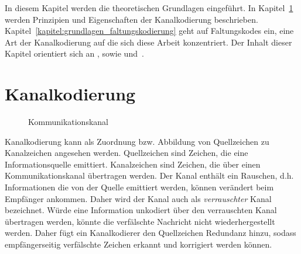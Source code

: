 In diesem Kapitel werden die theoretischen Grundlagen eingeführt. In Kapitel~\ref{kapitel:grundlagen_kanalkodierung} werden Prinzipien und Eigenschaften der Kanalkodierung beschrieben. Kapitel~\ref{kapitel:grundlagen_faltungskodierung} geht auf Faltungskodes ein, eine Art der Kanalkodierung auf die sich diese Arbeit konzentriert. Der Inhalt dieser Kapitel orientiert sich an \cite{huffman2010fundamentals}, sowie \cite{morelos2006art} und~\cite{schonfeld2012informations}.
\section{Kanalkodierung}
\label{kapitel:grundlagen_kanalkodierung}
\begin{figure}[t]
\centering
\resizebox{\textwidth}{!}{%
	
}
\caption{Kommunikationskanal}
\label{abb:kommunikationskanal}
\end{figure}
Kanalkodierung kann als Zuordnung bzw. Abbildung von Quellzeichen zu Kanalzeichen angesehen werden. Quellzeichen sind Zeichen, die eine Informationsquelle emittiert. Kanalzeichen sind Zeichen, die über einen Kommunikationskanal übertragen werden. Der Kanal enthält ein Rauschen, d.h. Informationen die von der Quelle emittiert werden, können verändert beim Empfänger ankommen. Daher wird der Kanal auch als \emph{verrauschter} Kanal bezeichnet. Würde eine Information unkodiert über den verrauschten Kanal übertragen werden, könnte die verfälschte Nachricht nicht wiederhergestellt werden. Daher fügt ein Kanalkodierer den Quellzeichen Redundanz hinzu, sodass empfängerseitig verfälschte Zeichen erkannt und korrigiert werden können.

